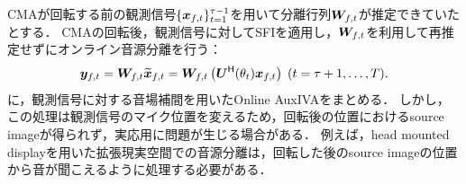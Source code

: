 \documentclass[sip,biber]{now-journal}
\begin{document}
CMAが回転する前の観測信号$\{\Obs _{\ft}\} _{\tframe = 1} ^{\rotFra - 1}$を用いて分離行列$\Demix _{\ft}$が推定できていたとする．
CMAの回転後，観測信号に対してSFIを適用し，$\Demix _{\ft}$を利用して再推定せずにオンライン音源分離を行う：
\begin{equation}
  \Est _{\ft} = \Demix _{\ft} \refpos{\Obs} _{\ft} = \Demix _{\ft} \left(\rotMat ^{\hermite} (\rotSpat _{\tframe}) \Obs _{\ft}\right)\; (\tframe = \rotFra + 1, \dots, \Tframe).
\end{equation}
に，観測信号に対する音場補間を用いたOnline AuxIVAをまとめる．
しかし，この処理は観測信号のマイク位置を変えるため，回転後の位置におけるsource imageが得られず，実応用に問題が生じる場合がある．
例えば，head mounted displayを用いた拡張現実空間での音源分離は，回転した後のsource imageの位置から音が聞こえるように処理する必要がある．
\end{document}

